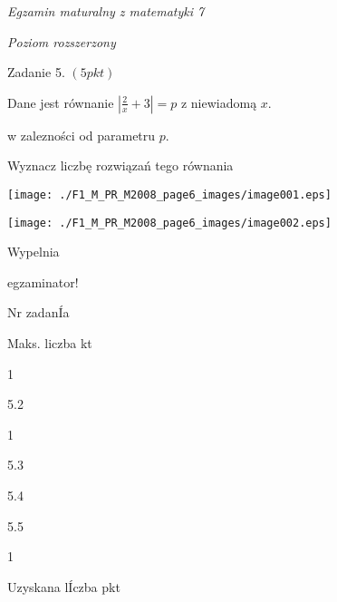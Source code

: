 \documentclass[a4paper,12pt]{article}
\begin{document}
{\it Egzamin maturalny z matematyki 7}

{\it Poziom rozszerzony}

Zadanie 5. $(5pkt)$

Dane jest równanie $|\displaystyle \frac{2}{x}+3|=p$ z niewiadomą $x.$

w zalezności od parametru $p.$

Wyznacz liczbę rozwiązań tego równania
\begin{center}
\texttt{[image: ./F1\_M\_PR\_M2008\_page6\_images/image001.eps]}

\texttt{[image: ./F1\_M\_PR\_M2008\_page6\_images/image002.eps]}
\end{center}
Wypelnia

egzaminator!

Nr zadanÍa

Maks. liczba kt

1

5.2

1

5.3

5.4

5.5

1

Uzyskana lÍczba pkt
\end{document}
